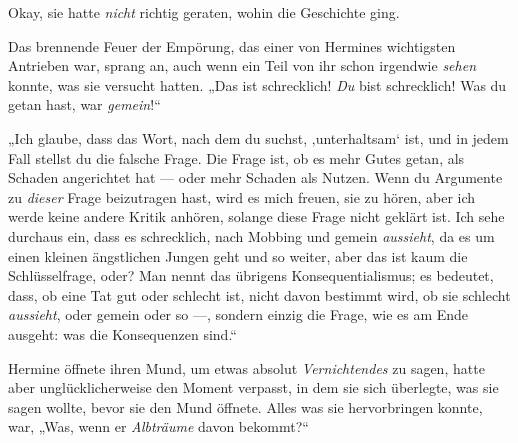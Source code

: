 Okay, sie hatte \emph{nicht} richtig geraten, wohin die Geschichte ging.

Das brennende Feuer der Empörung, das einer von Hermines wichtigsten Antrieben war, sprang an, auch wenn ein Teil von ihr schon irgendwie \emph{sehen} konnte, was sie versucht hatten.
„Das ist schrecklich! \emph{Du} bist schrecklich! Was du getan hast, war \emph{gemein}!“

„Ich glaube, dass das Wort, nach dem du suchst, ‚unterhaltsam‘ ist, und in jedem Fall stellst du die falsche Frage. Die Frage ist, ob es mehr Gutes getan, als Schaden angerichtet hat — oder mehr Schaden als Nutzen. Wenn du Argumente zu \emph{dieser} Frage beizutragen hast, wird es mich freuen, sie zu hören, aber ich werde keine andere Kritik anhören, solange diese Frage nicht geklärt ist. Ich sehe durchaus ein, dass es schrecklich, nach Mobbing und gemein \emph{aussieht}, da es um einen kleinen ängstlichen Jungen geht und so weiter, aber das ist kaum die Schlüsselfrage, oder? Man nennt das übrigens Konsequentialismus; es bedeutet, dass, ob eine Tat gut oder schlecht ist, nicht davon bestimmt wird, ob sie schlecht \emph{aussieht}, oder gemein oder so —, sondern einzig die Frage, wie es am Ende ausgeht: was die Konsequenzen sind.“

Hermine öffnete ihren Mund, um etwas absolut \emph{Vernichtendes} zu sagen, hatte aber unglücklicherweise den Moment verpasst, in dem sie sich überlegte, was sie sagen wollte, bevor sie den Mund öffnete. Alles was sie hervorbringen konnte, war,
„Was, wenn er \emph{Albträume} davon bekommt?“

